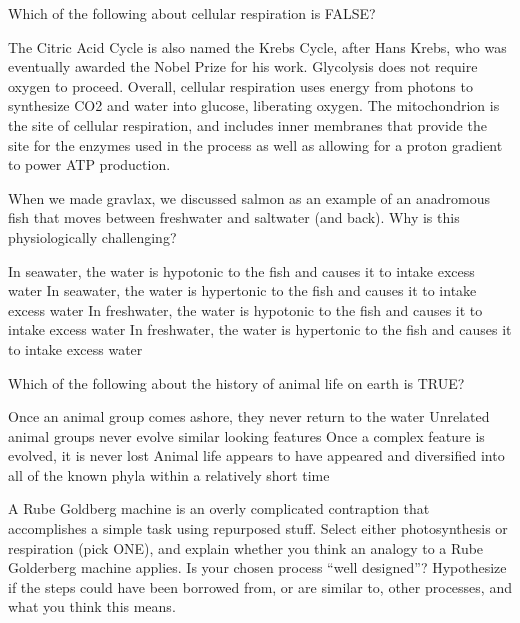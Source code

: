 \documentclass[exam,addpoints,noanswers]{exam}
\begin{document}
\begin{questions}
\question[1] Which of the following about cellular respiration is FALSE? 
\begin{choices}
\choice The Citric Acid Cycle is also named the Krebs Cycle, after Hans Krebs, who was eventually awarded the Nobel Prize for his work. 
\choice Glycolysis does not require oxygen to proceed. 
\CorrectChoice Overall, cellular respiration uses energy from photons to synthesize CO2 and water into glucose, liberating oxygen. 
\choice The mitochondrion is the site of cellular respiration, and includes inner membranes that provide the site for the enzymes used in the process as well as allowing for a proton gradient to power ATP production. 
\end{choices}




\question[1] When we made gravlax, we discussed salmon as an example of an anadromous fish that moves between freshwater and saltwater (and back). Why is this physiologically challenging? 
\begin{choices}
\choice In seawater, the water is hypotonic to the fish and causes it to intake excess water
\choice In seawater, the water is hypertonic to the fish and causes it to intake excess water
\CorrectChoice In freshwater, the water is hypotonic to the fish and causes it to intake excess water
\choice In freshwater, the water is hypertonic to the fish and causes it to intake excess water
\end{choices}




\question[1] Which of the following about the history of animal life on earth is TRUE? 
\begin{choices}
\choice Once an animal group comes ashore, they never return to the water
\choice Unrelated animal groups never evolve similar looking features
\choice Once a complex feature is evolved, it is never lost
\CorrectChoice Animal life appears to have appeared and diversified into all of the known phyla within a relatively short time
\end{choices}



\clearpage
\question[22] A Rube Goldberg machine is an overly complicated contraption that accomplishes a simple task using repurposed stuff. Select either photosynthesis or respiration (pick ONE), and explain whether you think an analogy to a Rube Golderberg machine applies. Is your chosen process ``well designed''? Hypothesize if the steps could have been borrowed from, or are similar to, other processes, and what you think this means. 


\end{questions}
\end{document}
